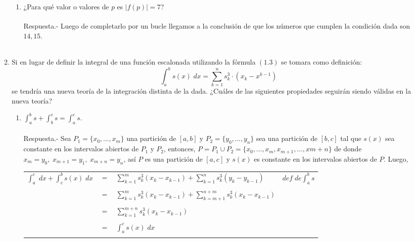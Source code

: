 \begin{enumerate}[ \bfseries 1.]
\begin{enumerate}[\bfseries (a)]
	\item ¿Para qué valor o valores de $p$ es $|f(p)|=7$?\\\\
	    Respuesta.-\; Luego de completarlo por un bucle llegamos a la conclusión de que los números que cumplen la condición dada son $14,15$.\\\\

    \end{enumerate}

    \item  Si en lugar de definir la integral de una función escalonada utilizando la fórmula $(1.3)$ se tomara como definición: $$\displaystyle\int_{a}^{b} s(x)\; dx = \sum\limits_{k=1}^{n} s_k^3 \cdot (x_k - x^{k-1})$$ se tendría una nueva teoría de la integración distinta de la dada. ¿Cuáles de las siguientes propiedades seguirán siendo válidas en la nueva teoría?

    \begin{enumerate}[\bfseries (a)]
	
	\item $\displaystyle\int_{a}^{b} s + \int_{b}^{c} s = \int_{a}^{c} s.$\\\\
	    Respuesta.-\; Sea $P_1 =\lbrace x_0,...,x_m\rbrace$ una partición de $[a,b]$ y $P_2 = \lbrace y_0,...,y_n \rbrace$ sea una partición de $[b,c]$ tal que $s(x)$ sea constante en los intervalos abiertos de $P_1$ y $P_2$, entonces, $P=P_1\cup P_2 =\lbrace x_0,...,x_m,x_{m+1},...,x{m+n} \rbrace$ de donde $x_m = y_0, \; x_{m+1} = y_1, \; x_{m+n} = y_n$, así $P$ es una partición de $[a,c]$ y $s(x)$ es constante en los intervalos abiertos de $P$. Luego,
	    \begin{center}
		\begin{tabular}{rcll}
		    $\displaystyle\int_{a}^{c} \; dx + \int_{c}^{b} s(x) \; dx$&$=$&$\sum\limits_{k=1}^{m} s_k^3 (x_k - x_{k-1}) + \sum\limits_{k=1}^{n} s_k^3 (y_k - y_{k-1})$&$def \; de \displaystyle\int_{a}^{b} s$\\\\
		    &$=$&$\sum\limits_{k=1}^{m} s_k^3 (x_k - x_{k-1}) + \sum\limits_{k=m+1}^{n+m} s_k^3 (x_k - x_{k-1})$&\\\\
		    &$=$&$\sum\limits_{k=1}^{m+n} s_k^3(x_k - x_{k-1})$&\\\\
		    &$=$&$\displaystyle\int_{a}^{c} s(x) \; dx$&\\\\
		\end{tabular}
	    \end{center}


\end{enumerate}
\end{enumerate}
